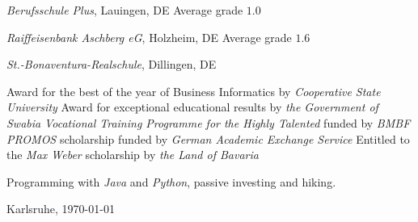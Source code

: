 \documentclass[10pt]{article}
\begin{document}
 \vspace{0.01in} 
\newline \emph{Berufsschule Plus}, Lauingen, DE
\newline\noindent Average grade $1.0$
\medskip

 \vspace{0.01in} 
\newline \noindent \emph{Raiffeisenbank Aschberg eG}, Holzheim, DE
\newline\noindent Average grade $1.6$
\medskip

 \vspace{0.01in} 
\newline \noindent \emph{St.-Bonaventura-Realschule}, Dillingen, DE
\medskip

\medskip
{}
\noindent Award for the best of the year of Business Informatics by \textit{Cooperative State University} 
\medskip
\newline\noindent Award for exceptional educational results by \textit{the Government of Swabia} 
\medskip
\bigskip
{}
\newline\noindent \textit{Vocational Training Programme for the Highly Talented} funded by \textit{BMBF} 
\medskip
\newline\noindent \textit{PROMOS} scholarship funded by \textit{German Academic Exchange Service} 
\medskip
\newline\noindent Entitled to the \textit{Max Weber} scholarship by \textit{the Land of Bavaria} 
\medskip

\medskip
{}
\noindent Programming with \textit{Java} and \textit{Python}, passive investing and hiking.
\medskip
\newline\noindent
\bigskip

\bigskip
\noindent Karlsruhe, \today
\medskip
\end{document}
